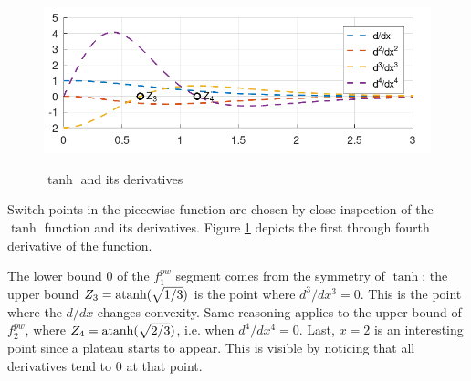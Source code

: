 \begin{figure}
    \centering
    \includegraphics[width=0.95\columnwidth]{images/tanhDerivatives.png}
    \label{fig:tanhDiffs}
    \caption{$\tanh$ and its derivatives}
\end{figure}
Switch points in the piecewise function are chosen by close inspection of the $\tanh$ function and
its derivatives. Figure \ref{fig:tanhDiffs} depicts the first through fourth derivative of the
function.

The lower bound $0$ of the $f_{1}^{pw}$ segment comes from the symmetry of $\tanh$; the upper bound
$Z_{3} = \operatorname{atanh}(\sqrt{1/3})$ is the point where $d^{3}/dx^{3} = 0$. This is the point where the
$d/dx$ changes convexity. Same reasoning applies to the upper bound of $f_{2}^{pw}$, where $Z_{4} =
\operatorname{atanh}(\sqrt{2/3})$, i.e. when $d^{4}/dx^{4} = 0$. Last, $x = 2$ is an interesting point since a
plateau starts to appear. This is visible by noticing that all derivatives tend to $0$ at that
point.
